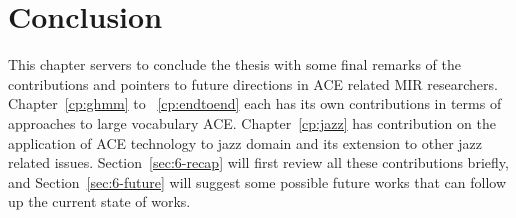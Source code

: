 

\chapter{Conclusion}\label{cp:conclude} %

%



\ifpdf
    \graphicspath{{8/figures/PNG/}{8/figures/PDF/}{8/figures/}}
\else
    \graphicspath{{8/figures/EPS/}{8/figures/}}
\fi


This chapter servers to conclude the thesis with some final remarks of the contributions and pointers to future directions in ACE related MIR researchers. Chapter~\ref{cp:ghmm} to ~\ref{cp:endtoend} each has its own contributions in terms of approaches to large vocabulary ACE. Chapter~\ref{cp:jazz} has contribution on the application of ACE technology to jazz domain and its extension to other jazz related issues. Section~\ref{sec:6-recap} will first review all these contributions briefly, and Section~\ref{sec:6-future} will suggest some possible future works that can follow up the current state of works.

